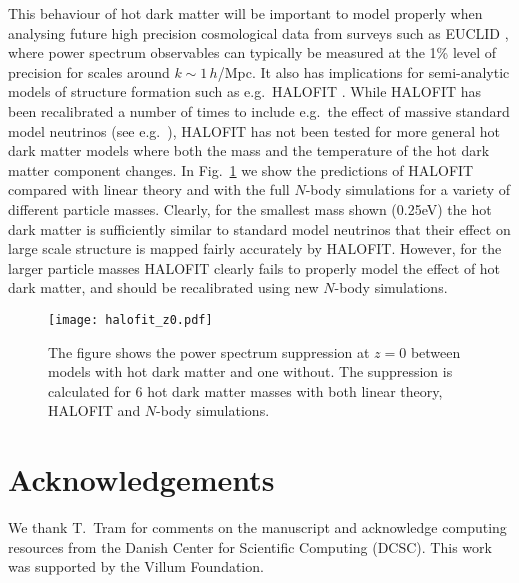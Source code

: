 \documentclass[11pt,a4paper]{article}
\renewcommand\({\left(}
\renewcommand\){\right)}
\renewcommand\[{\left[}
\renewcommand\]{\right]}
\begin{document}
This behaviour of hot dark matter will be important to model properly when analysing future high precision cosmological data from surveys such as EUCLID \cite{Laureijs:2011gra}, where power spectrum observables can typically be measured at the 1\% level of precision for scales around $k \sim 1 \, h$/Mpc.
It also has implications for semi-analytic models of structure formation such as e.g.\ HALOFIT \cite{Smith:2002dz}. While HALOFIT has been 
recalibrated a number of times to include e.g.\ the effect of massive standard model neutrinos (see e.g.\ \cite{Bird:2011rb}), HALOFIT has not been tested for more general hot dark matter models where both the mass and the temperature of the hot dark matter component changes.
In Fig.~\ref{fig:halofit} we show the predictions of HALOFIT compared with linear theory and with the full $N$-body simulations for a variety of different particle masses. Clearly, for the smallest mass shown (0.25eV) the hot dark matter is sufficiently similar to standard model neutrinos that their effect on large scale structure is mapped fairly accurately by HALOFIT. However, for the larger particle masses HALOFIT clearly fails to properly model the effect of hot dark matter, and should be recalibrated using new $N$-body simulations.


 \begin{figure}[t]
  \vspace*{-1.0cm}
\begin{center}
\hspace*{-0.2cm}
\texttt{[image: halofit\_z0.pdf]}
\end{center}
 \vspace*{-2.5cm}
\caption{The figure shows the power spectrum suppression at $z=0$ between models with hot dark matter and one without. The suppression is calculated for 6 hot dark matter masses with both linear theory, HALOFIT and $N$-body simulations.}
   \label{fig:halofit}
\end{figure}



\section*{Acknowledgements}
We thank T.~Tram for comments on the manuscript and acknowledge computing resources from the Danish Center for Scientific Computing (DCSC). This work was supported by the Villum Foundation.
\end{document}
